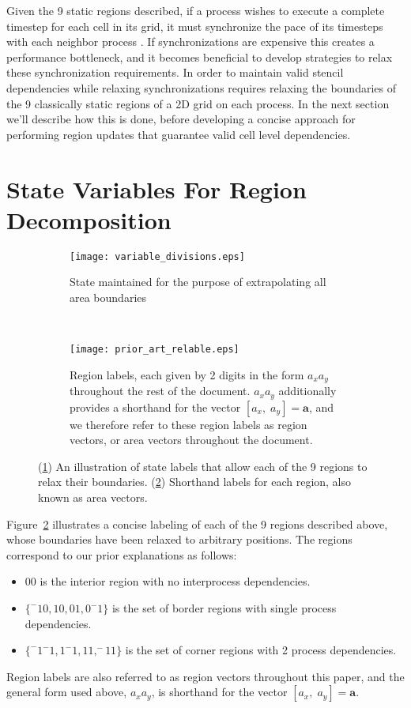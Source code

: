 Given the 9 static regions described, if a process wishes to execute a complete
timestep for each cell in its grid, it must synchronize the pace of its timesteps
with each neighbor process .
If synchronizations are expensive this creates a performance bottleneck, and
it becomes beneficial
to develop strategies to relax these synchronization requirements.
In order to maintain
valid stencil dependencies while relaxing synchronizations
requires relaxing the boundaries of the 9 classically
static regions of a 2D grid
on each process.  In the next section we'll describe how this is done, before
developing a concise approach for performing region updates
that guarantee valid cell level dependencies.
ْ
\section{State Variables For Region Decomposition}\label{sec:state}

\begin{figure}[t]
  \centering
  \begin{subfigure}[t]{.5\textwidth}
    \centering
    \texttt{[image: variable\_divisions.eps]}
    \caption{State maintained for the purpose of extrapolating all area boundaries}
    \label{fig:state_labels}
  \end{subfigure}
  ~
  \begin{subfigure}[t]{.4\textwidth}
    \centering
    \texttt{[image: prior\_art\_relable.eps]}
    \caption{Region labels, each given by 2 digits in the form $a_xa_y$ throughout the rest of the document.
    $a_xa_y$ additionally provides a shorthand for the vector $[a_x,\; a_y] = \mathbf{a}$, and we therefore refer to
    these region labels as region vectors, or area vectors throughout the document.}\label{fig:region_vectors}
    \end{subfigure}
  \caption{(\ref{fig:state_labels}) An illustration of state labels that allow each of the 9 regions to relax their
  boundaries.  (\ref{fig:region_vectors}) Shorthand labels for each region, also known as area vectors.}
  \label{fig:local_decomposition}
\end{figure}

Figure~\ref{fig:region_vectors} illustrates a concise labeling of
each of the 9 regions described above, whose boundaries have been
relaxed to arbitrary positions.  The regions correspond to our
prior explanations as follows:
\begin{itemize}
  \item $00$ is the interior region with no interprocess dependencies.
  \item $\{^-10,10,01,0^-1 \}$ is the set of border regions with single process dependencies.
  \item $\{^-1^-1,1^-1,11,^-11 \}$ is the set of corner regions with 2 process dependencies.
\end{itemize}
Region labels are also referred to as region vectors throughout this
paper, and the general form used above, $a_xa_y$, is
shorthand for the vector $[a_x,\; a_y] = \mathbf{a}$.

